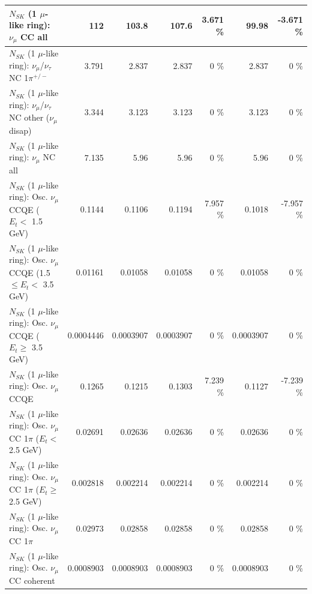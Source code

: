 \begin{table}
\begin{tabular}{| l | r | r | r  r | r  r |}
                                $N_{SK}$ (1 $\mu$-like ring): $\nu_{\mu}$ CC all &             112 &           103.8 &           107.6 &    3.671 \%  &           99.98 &   -3.671 \%  \\ 
\hline
              $N_{SK}$ (1 $\mu$-like ring): $\nu_\mu$/$\nu_\tau$ NC 1$\pi^{+/-}$ &           3.791 &           2.837 &           2.837 &        0 \%  &           2.837 &        0 \%  \\ 
   $N_{SK}$ (1 $\mu$-like ring): $\nu_\mu$/$\nu_\tau$ NC other ($\nu_\mu$ disap) &           3.344 &           3.123 &           3.123 &        0 \%  &           3.123 &        0 \%  \\ 
                                $N_{SK}$ (1 $\mu$-like ring): $\nu_{\mu}$ NC all &           7.135 &            5.96 &            5.96 &        0 \%  &            5.96 &        0 \%  \\ 
\hline
\hline
           $N_{SK}$ (1 $\mu$-like ring): Osc. $\nu_\mu$ CCQE ($E_{t} <$ 1.5 GeV) &          0.1144 &          0.1106 &          0.1194 &    7.957 \%  &          0.1018 &   -7.957 \%  \\ 
  $N_{SK}$ (1 $\mu$-like ring): Osc. $\nu_\mu$ CCQE (1.5 $\leq E_{t} <$ 3.5 GeV) &         0.01161 &         0.01058 &         0.01058 &        0 \%  &         0.01058 &        0 \%  \\ 
        $N_{SK}$ (1 $\mu$-like ring): Osc. $\nu_\mu$ CCQE ($E_{t} \geq$ 3.5 GeV) &       0.0004446 &       0.0003907 &       0.0003907 &        0 \%  &       0.0003907 &        0 \%  \\ 
\hline
                               $N_{SK}$ (1 $\mu$-like ring): Osc. $\nu_\mu$ CCQE &          0.1265 &          0.1215 &          0.1303 &    7.239 \%  &          0.1127 &   -7.239 \%  \\ 
\hline
      $N_{SK}$ (1 $\mu$-like ring): Osc. $\nu_\mu$ CC 1$\pi$ ($E_{t} <$ 2.5 GeV) &         0.02691 &         0.02636 &         0.02636 &        0 \%  &         0.02636 &        0 \%  \\ 
   $N_{SK}$ (1 $\mu$-like ring): Osc. $\nu_\mu$ CC 1$\pi$ ($E_{t} \geq$ 2.5 GeV) &        0.002818 &        0.002214 &        0.002214 &        0 \%  &        0.002214 &        0 \%  \\ 
\hline
                          $N_{SK}$ (1 $\mu$-like ring): Osc. $\nu_\mu$ CC 1$\pi$ &         0.02973 &         0.02858 &         0.02858 &        0 \%  &         0.02858 &        0 \%  \\ 
                        $N_{SK}$ (1 $\mu$-like ring): Osc. $\nu_\mu$ CC coherent &       0.0008903 &       0.0008903 &       0.0008903 &        0 \%  &       0.0008903 &        0 \%  \\ 

\end{tabular}
\end{table}
